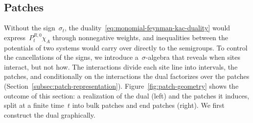 \documentclass[EJP,preprint,NODS,nobera]{ejpecp}
\begin{document}
\subsection{Patches}
\label{sec:patches}

Without the sign~$\sigma_t$, the duality~\eqref{eq:monomial-feynman-kac-duality}
would express~$P_t^{R,0}\chi_A$ through nonnegative weights, and inequalities
between the potentials of two systems would carry over directly to the
semigroups. To control the cancellations of the signs, we introduce
a~$\sigma$-algebra that reveals when sites interact, but not how. The
interactions divide each site line into intervals, the patches, and
conditionally on the interactions the dual factorizes over the patches
(Section~\ref{subsec:patch-representation}).
Figure~\ref{fig:patch-geometry} shows the outcome of this section: a
realization of the dual (left) and the patches it induces, split at a finite
time~$t$ into bulk patches and end patches (right). We first construct the dual
graphically.
\end{document}
